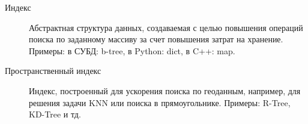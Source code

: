   \Defines %
\begin{description}
    \item[Индекс] Абстрактная структура данных, создаваемая с целью повышения операций поиска по заданному массиву за счет повышения затрат на хранение. Примеры: в СУБД: b-tree, в Python: dict, в C++: map.
    \item[Пространственный индекс] Индекс, построенный для ускорения поиска по геоданным, например, для решения задачи KNN или поиска в прямоугольнике. Примеры: R-Tree, KD-Tree и тд.
\end{description}

